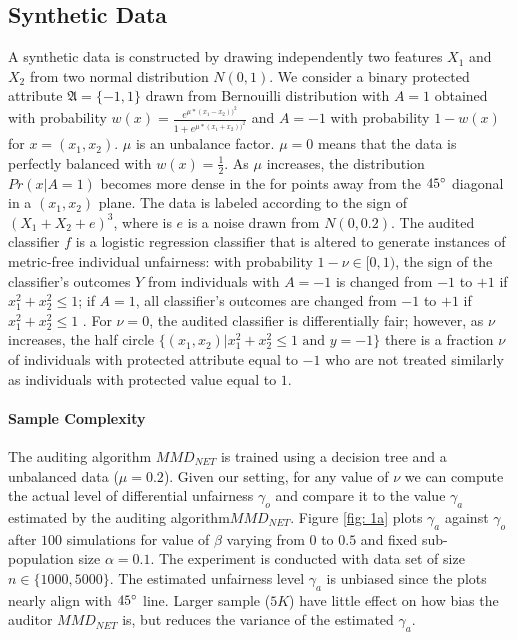 \documentclass{article}
\begin{document}
\subsection{Synthetic Data}
A synthetic data is constructed by drawing independently two features $X_{1}$ and $X_{2}$ from two normal distribution $N(0, 1)$. We consider a binary protected attribute  $\mathfrak{A}=\{-1, 1\}$ drawn from Bernouilli distribution with $A=1$ obtained with probability $w(x)=\frac{e^{\mu * (x_{1}- x_{2}))^{2}}}{1 + e^{\mu * (x_{1}+ x_{2}))^{2}}}$ and $A=-1$ with probability $1-w(x)$ for $x=(x_{1}, x_{2})$. $\mu$ is an unbalance factor. $\mu=0$ means that the data is perfectly balanced with $w(x)=\frac{1}{2}$. As $\mu$ increases, the distribution $Pr(x|A=1)$ becomes more dense in the for points away from the $45\degree$ diagonal in a $(x_{1}, x_{2})$ plane. The data is labeled according to the sign of $(X_{1} + X_{2} + e) ^{3}$, where is $e$ is a noise drawn from $N(0, 0.2)$. The audited classifier $f$ is a logistic regression classifier that is altered to generate instances of metric-free individual unfairness: with probability $1-\nu\in[0, 1)$, the sign of the classifier's outcomes $Y$ from individuals with $A=-1$ is changed from $-1$ to $+1$ if $x^{2}_{1} + x^{2}_{2} \leq 1$; if $A=1$, all classifier's outcomes are changed from $-1$ to $+1$ if $x^{2}_{1} + x^{2}_{2} \leq 1$ . For $\nu=0$, the audited classifier is differentially fair; however, as $\nu$ increases, the half circle $\{(x_{1}, x_{2})|x^{2}_{1} + x^{2}_{2} \leq 1 \mbox{ and } y=-1\}$ there is a fraction $\nu$ of individuals with protected attribute equal to $-1$ who are not treated similarly as individuals with protected value equal to $1$. 

\bigskip
\paragraph{Sample Complexity}
The auditing algorithm $MMD_{NET}$ is trained using a decision tree and a unbalanced data ($\mu=0.2$). Given our setting, for any value of $\nu$ we can compute the actual level of differential unfairness $\gamma_{o}$ and compare it to the value  $\gamma_{a}$ estimated by the auditing algorithm$MMD_{NET}$.  Figure \ref{fig: 1a} plots $\gamma_{a}$ against $\gamma_{o}$ after $100$ simulations for value of $\beta$ varying from $0$ to $0.5$ and fixed sub-population size $\alpha=0.1$. The experiment is conducted with data set of size $n\in \{1000, 5000\}$. The estimated unfairness level $\gamma_{a}$ is unbiased since the plots nearly align with $45\degree$ line. Larger sample ($5K$) have little effect on how bias the auditor $MMD_{NET}$ is, but reduces the variance of the estimated $\gamma_{a}$.  
\end{document}
